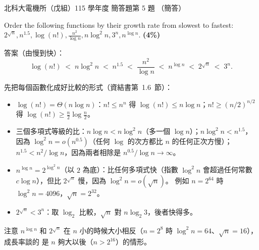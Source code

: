 \begin{pastexam}[label={px:ntut-115-ee-ds-20}]{北科大電機所（戊組）115 學年度 簡答題第 5 題}
（簡答）

Order the following functions by their growth rate from slowest to fastest: $2^{\sqrt{n}}, n^{1.5},
\log(n!), \frac{n^2}{\log n}, n\log^2 n, 3^n, n^{\log n}$. \textbf{(4\%)}
\end{pastexam}

\begin{pastsoln}
答案（由慢到快）：
\[
\log(n!) \;<\; n \log^2 n \;<\; n^{1.5} \;<\; \frac{n^2}{\log n} \;<\; n^{\log n} \;<\; 2^{\sqrt n} \;<\; 3^n .
\]

先把每個函數化成好比較的形式（資結書第~1.6~節）：
\begin{itemize}
\item $\log(n!) = \Theta(n \log n)$：$n! \le n^n$ 得 $\log(n!) \le n \log n$；$n! \ge (n/2)^{n/2}$ 得
$\log(n!) \ge \frac n2 \log \frac n2$。
\item 三個多項式等級的比：$n \log n < n \log^2 n$（多一個 $\log n$）；$n \log^2 n < n^{1.5}$，因為
$\log^2 n = o(n^{0.5})$（任何 $\log$ 的次方都比 $n$ 的任何正次方慢）；$n^{1.5} < n^2/\log n$，因為兩者相除是
$n^{0.5}/\log n \to \infty$。
\item $n^{\log n} = 2^{\log^2 n}$（以 $2$ 為底）：比任何多項式快（指數 $\log^2 n$ 會超過任何常數 $c \log n$），但比
$2^{\sqrt n}$ 慢，因為 $\log^2 n = o(\sqrt n)$。 例如 $n = 2^{64}$ 時 $\log^2 n = 4096$，$\sqrt n = 2^{32}$。
\item $2^{\sqrt n} < 3^n$：取 $\log_2$ 比較，$\sqrt n$ 對 $n \log_2 3$，後者快得多。
\end{itemize}
注意 $n^{\log n}$ 和 $2^{\sqrt n}$ 在 $n$ 小的時候大小相反（$n = 2^{8}$ 時 $\log^2 n = 64$、$\sqrt n = 16$），成長率談的
是 $n$ 夠大以後（$n > 2^{16}$）的情形。
\end{pastsoln}

